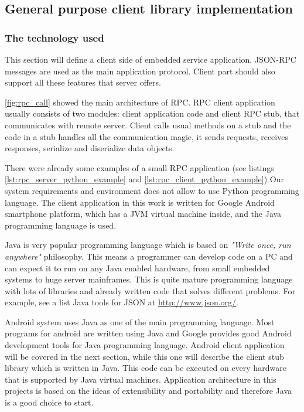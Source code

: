 \newpage
\subsection{General purpose client library implementation}
\label{sec:java_library}

\subsubsection{The technology used}
This section will define a client side of embedded service application.
JSON-RPC messages are used as the main application protocol.
Client part should also support all these features that server offers.

\autoref{fig:rpc_call} showed the main architecture of RPC.
RPC client   application usually consists of two modules: client application code
and client RPC stub, that communicates with remote server.
Client calls usual methods on a stub and the code in a stub handles all
the communication magic, it sends requests, receives responses, serialize and
diserialize data objects.

There were already some examples of a small RPC application (see listings
\ref{lst:rpc_server_python_example} and
\ref{lst:rpc_client_python_example})
Our system requirements and environment does not allow to use Python programming
language.
The client application in this work is written for Google Android smartphone
platform, which has a \gls{JVM} virtual machine inside, and the Java programming
language is used.

Java is very popular programming language which is based on \textit{"Write
once, run anywhere"} philosophy. This means a programmer can develop code on a
PC and can expect it to run on any Java enabled hardware, from small embedded systems
to huge server mainframes. 
This is quite mature programming language with lots of libraries and already
written code that solves different problems. For example, see a list Java tools
for JSON at \url{http://www.json.org/}.

Android system uses Java as one of the main programming language. 
Most programs for android are written using Java and Google provides good
Android development tools for Java programming language.
Android client application will be covered in the next section, while this one will describe the client
stub library which is written in Java. 
This code can be executed on every hardware that is supported by Java virtual
machines. Application architecture in this projects is based on the ideas of
extensibility and portability and therefore Java is a good choice to start.

